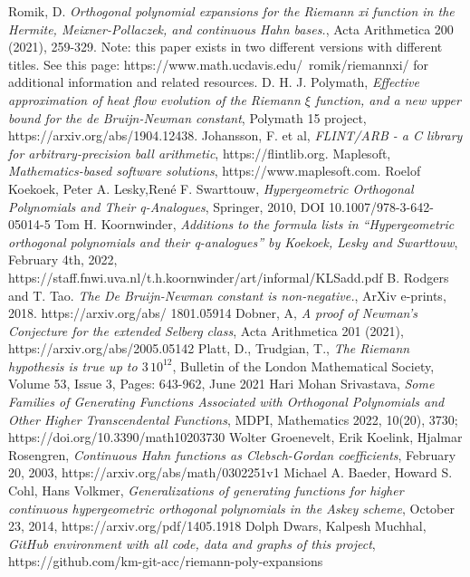 \documentclass[a4paper,11pt,twoside]{amsart}
\begin{document}
\begin{thebibliography}{} 
Romik, D. \emph{Orthogonal polynomial expansions for the Riemann xi function in the Hermite, Meixner-Pollaczek, and continuous Hahn bases.}, Acta Arithmetica 200 (2021), 259-329.
Note: this paper exists in two different versions with different titles. See this page: https://www.math.ucdavis.edu/~romik/riemannxi/ for additional information and related resources. 
D. H. J. Polymath, \emph{Effective approximation of heat flow evolution of the Riemann $\xi$ function, and a new upper bound for the de Bruijn-Newman constant}, Polymath 15 project, https://arxiv.org/abs/1904.12438.
Johansson, F. et al, \emph{FLINT/ARB - a C library for arbitrary-precision ball arithmetic}, https://flintlib.org.
Maplesoft, \emph{Mathematics-based software solutions}, https://www.maplesoft.com.
Roelof Koekoek, Peter A. Lesky,René F. Swarttouw, \emph{Hypergeometric Orthogonal Polynomials and Their q-Analogues}, Springer, 2010, DOI 10.1007/978-3-642-05014-5
Tom H. Koornwinder, \emph{Additions to the formula lists in “Hypergeometric orthogonal polynomials and their q-analogues” by Koekoek, Lesky and Swarttouw}, February 4th, 2022, https://staff.fnwi.uva.nl/t.h.koornwinder/art/informal/KLSadd.pdf
B. Rodgers and T. Tao. \emph{The De Bruijn-Newman constant is non-negative.}, ArXiv e-prints, 2018. https://arxiv.org/abs/ 1801.05914
Dobner, A, \emph{A proof of Newman’s Conjecture for the extended Selberg class}, Acta Arithmetica 201 (2021), https://arxiv.org/abs/2005.05142
Platt, D., Trudgian, T., \emph{The Riemann hypothesis is true up to $3\,10^{12}$}, Bulletin of the London Mathematical Society, Volume 53, Issue 3, Pages: 643-962, June 2021
Hari Mohan Srivastava, \emph{Some Families of Generating Functions Associated with Orthogonal Polynomials and Other Higher Transcendental Functions}, MDPI, Mathematics 2022, 10(20), 3730; https://doi.org/10.3390/math10203730
Wolter Groenevelt, Erik Koelink, Hjalmar Rosengren, \emph{Continuous Hahn functions as Clebsch-Gordan coefficients}, February 20, 2003, https://arxiv.org/abs/math/0302251v1
Michael A. Baeder, Howard S. Cohl, Hans Volkmer, \emph{Generalizations of generating functions for higher continuous hypergeometric orthogonal polynomials in the Askey scheme}, October 23, 2014, https://arxiv.org/pdf/1405.1918
Dolph Dwars, Kalpesh Muchhal, \emph{GitHub environment with all code, data and graphs of this project}, https://github.com/km-git-acc/riemann-poly-expansions
\end{thebibliography}{} 
\end{document}
